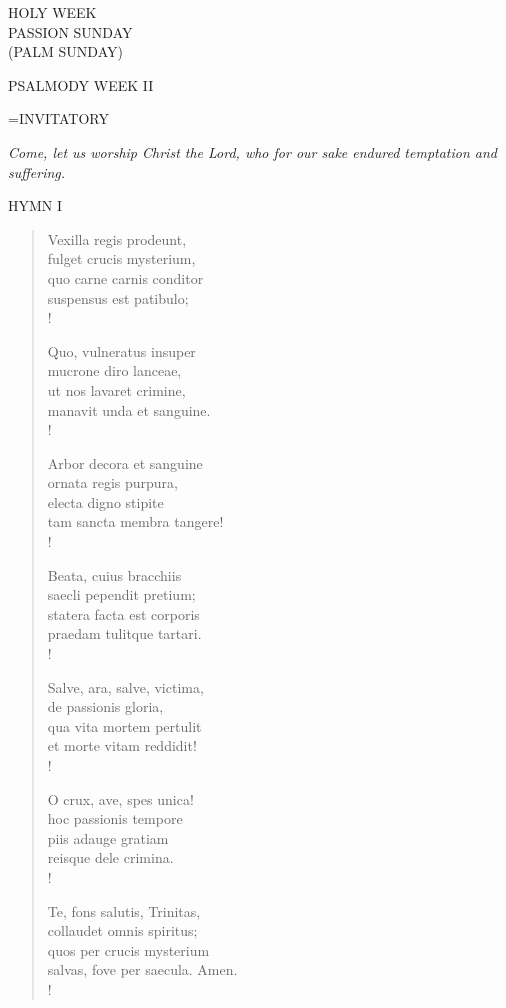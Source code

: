 \begin{center}\normalsize HOLY WEEK\\
\footnotesize PASSION SUNDAY\\
\footnotesize (PALM SUNDAY)\\
\end{center}

PSALMODY WEEK II

\hangindent=\parindent \small{INVITATORY}
\begin{center}
\textit{Come, let us worship Christ the Lord, who for our sake endured temptation and suffering.\\}
\end{center}

\noindent\small{\uppercase{Hymn I }}\normalsize\label{holyweek:firstHymn}
\begin{verse}
Vexilla regis prodeunt,\\
fulget crucis mysterium,\\
quo carne carnis conditor\\
suspensus est patibulo;\\!

Quo, vulneratus insuper \\
mucrone diro lanceae,\\
ut nos lavaret crimine,\\
manavit unda et sanguine.\\!

Arbor decora et sanguine\\
ornata regis purpura,\\
electa digno stipite\\
tam sancta membra tangere!\\!

Beata, cuius bracchiis\\
saecli pependit pretium;\\
statera facta est corporis\\
praedam tulitque tartari.\\!

Salve, ara, salve, victima,\\
de passionis gloria,\\
qua vita mortem pertulit\\
et morte vitam reddidit!\\!

O crux, ave, spes unica!\\
hoc passionis tempore\\
piis adauge gratiam\\
reisque dele crimina.\\!

Te, fons salutis, Trinitas,\\
collaudet omnis spiritus;\\
quos per crucis mysterium\\
salvas, fove per saecula. Amen.\\!
\end{verse}

